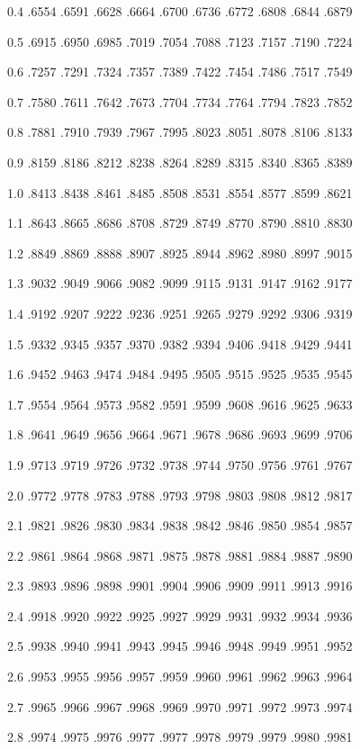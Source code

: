 \documentclass[12pt,fleqn]{article}\usepackage{../../common}
\begin{document}
0.4 .6554 .6591 .6628 .6664 .6700 .6736 .6772 .6808 .6844 .6879

0.5 .6915 .6950 .6985 .7019 .7054 .7088 .7123 .7157 .7190 .7224

0.6 .7257 .7291 .7324 .7357 .7389 .7422 .7454 .7486 .7517 .7549

0.7 .7580 .7611 .7642 .7673 .7704 .7734 .7764 .7794 .7823 .7852

0.8 .7881 .7910 .7939 .7967 .7995 .8023 .8051 .8078 .8106 .8133

0.9 .8159 .8186 .8212 .8238 .8264 .8289 .8315 .8340 .8365 .8389

1.0 .8413 .8438 .8461 .8485 .8508 .8531 .8554 .8577 .8599 .8621

1.1 .8643 .8665 .8686 .8708 .8729 .8749 .8770 .8790 .8810 .8830

1.2 .8849 .8869 .8888 .8907 .8925 .8944 .8962 .8980 .8997 .9015

1.3 .9032 .9049 .9066 .9082 .9099 .9115 .9131 .9147 .9162 .9177

1.4 .9192 .9207 .9222 .9236 .9251 .9265 .9279 .9292 .9306 .9319

1.5 .9332 .9345 .9357 .9370 .9382 .9394 .9406 .9418 .9429 .9441

1.6 .9452 .9463 .9474 .9484 .9495 .9505 .9515 .9525 .9535 .9545

1.7 .9554 .9564 .9573 .9582 .9591 .9599 .9608 .9616 .9625 .9633

1.8 .9641 .9649 .9656 .9664 .9671 .9678 .9686 .9693 .9699 .9706

1.9 .9713 .9719 .9726 .9732 .9738 .9744 .9750 .9756 .9761 .9767

2.0 .9772 .9778 .9783 .9788 .9793 .9798 .9803 .9808 .9812 .9817

2.1 .9821 .9826 .9830 .9834 .9838 .9842 .9846 .9850 .9854 .9857

2.2 .9861 .9864 .9868 .9871 .9875 .9878 .9881 .9884 .9887 .9890

2.3 .9893 .9896 .9898 .9901 .9904 .9906 .9909 .9911 .9913 .9916

2.4 .9918 .9920 .9922 .9925 .9927 .9929 .9931 .9932 .9934 .9936

2.5 .9938 .9940 .9941 .9943 .9945 .9946 .9948 .9949 .9951 .9952

2.6 .9953 .9955 .9956 .9957 .9959 .9960 .9961 .9962 .9963 .9964

2.7 .9965 .9966 .9967 .9968 .9969 .9970 .9971 .9972 .9973 .9974

2.8 .9974 .9975 .9976 .9977 .9977 .9978 .9979 .9979 .9980 .9981
\end{document}
